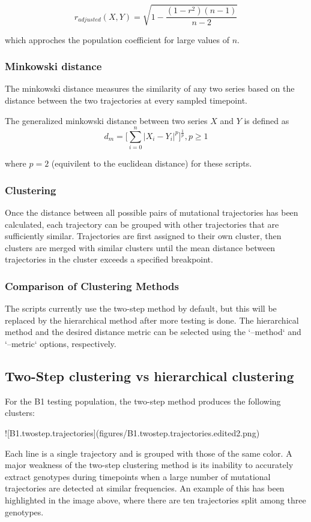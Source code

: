 \documentclass{report}
\begin{document}
$$
r_{adjusted}(X,Y) = \sqrt{1-\frac{(1-r^2)(n-1)}{n-2}}
$$

which approches the population coefficient for large values of $n$.


\subsubsection{Minkowski distance}
The minkowski distance measures the similarity of any two series based on the distance between the two trajectories at every sampled timepoint.

The generalized minkowski distance between two series $X$ and $Y$ is defined as
$$
d_m=\bigg[\sum_{i=0}^n|X_i-Y_i|^p\bigg]^\frac{1}{p}, p \ge 1
$$

where $p=2$ (equivilent to the euclidean distance) for these scripts.

\subsubsection{Clustering}

Once the distance between all possible pairs of mutational trajectories has been calculated, each trajectory can be grouped with other trajectories that are sufficiently similar. Trajectories are first assigned to their own cluster, then clusters are merged with similar clusters until the mean distance between trajectories in the cluster exceeds a specified breakpoint.

\subsubsection{Comparison of Clustering Methods}

The scripts currently use the two-step method by default, but this will be replaced by the hierarchical method after more testing is done.
The hierarchical method and the desired distance metric can be selected using the `--method` and `--metric` options, respectively.

\subsection{Two-Step clustering vs hierarchical clustering}

For the B1 testing population, the two-step method produces the following clusters:

![B1.twostep.trajectories](figures/B1.twostep.trajectories.edited2.png)

Each line is a single trajectory and is grouped with those of the same color. A major weakness of the two-step clustering method is its inability to accurately extract genotypes during timepoints when a large number of mutational trajectories are detected at similar frequencies. An example of this has been highlighted in the image above, where there are ten trajectories split among three genotypes.
\end{document}
